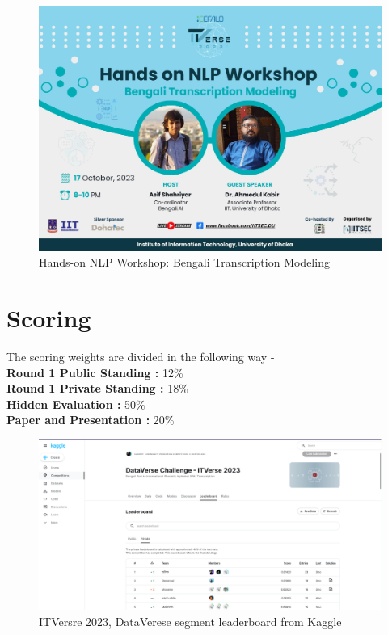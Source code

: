  \begin{figure}[htbp]
    \centering
    \includegraphics[width=\textwidth]{Images/Screenshot/NLP Workshop.jpg}
    \caption{Hands-on NLP Workshop: Bengali Transcription Modeling}
    \label{fig:workshop}
\end{figure} 

\section{Scoring}
The scoring weights are divided in the following way - \\
\textbf{Round 1 Public Standing :} 12\% \\
\textbf{Round 1 Private Standing :} 18\% \\
\textbf{Hidden Evaluation :} 50\% \\
\textbf{Paper and Presentation :} 20\% \\

 \begin{figure}[htbp]
    \centering
    \includegraphics[width=\textwidth]{Images/Screenshot/ITVersre.png}
    \caption{ITVersre 2023, DataVerese segment leaderboard from Kaggle}
    \label{fig:leaderboard}
\end{figure} 

